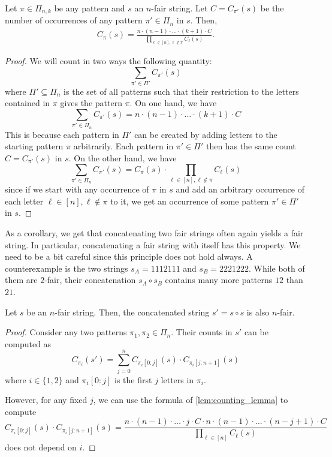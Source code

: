 \documentclass{article}
\begin{document}
\begin{lemma}
\label{lem:counting_lemma}
    Let $\pi \in \Pi_{n,k}$ be any pattern and $s$ an $n$-fair string. Let $C = C_{\pi'}(s)$ be the number of occurrences of any pattern $\pi' \in \Pi_n$ in $s$. Then, 
    \begin{align}
    \label{eq:counting_lemma}
    C_{\pi}(s) = \frac{n \cdot (n-1) \cdot \dots \cdot (k+1) \cdot C}{\prod_{\ell \in [n], \ell \not\in \pi} C_{\ell}(s) }. 
    \end{align}
\end{lemma}
\begin{proof}
We will count in two ways the following quantity: 
\[
\sum_{\pi' \in \Pi'}C_{\pi'}(s)
\]
where $\Pi' \subseteq \Pi_n$ is the set of all patterns such that their restriction to the letters contained in $\pi$ gives the pattern $\pi$. 
On one hand, we have  
\[
\sum_{\pi' \in \Pi_n}C_{\pi'}(s) 
=n \cdot (n-1) \cdot \dots \cdot (k+1) \cdot C
\]
This is because each pattern in $\Pi'$ can be created by adding letters to the starting pattern $\pi$ arbitrarily. Each pattern in $\pi' \in \Pi'$ then has the same count $C = C_{\pi'}(s)$ in $s$. 
On the other hand, we have  
\[
\sum_{\pi' \in \Pi_n}C_{\pi'}(s) 
= C_{\pi}(s) \cdot \prod_{\ell \in [n], \ell \not\in \pi} C_{\ell}(s)
\]
since if we start with any occurrence of $\pi$ in $s$ and add an arbitrary occurrence of each letter $\ell \in [n], \ell \not\in \pi$ to it, we get an occurrence of some pattern $\pi' \in \Pi'$ in $s$. 

\end{proof}

As a corollary, we get that concatenating two fair strings often again yields a fair string. In particular, concatenating a fair string with itself has this property. We need to be a bit careful since this principle does not hold always. A counterexample is the two strings $s_A = 1112111$ and $s_B = 2221222$. While both of them are $2$-fair, their concatenation $s_A \circ s_B$ contains many more patterns $12$ than $21$. 

\begin{corollary}
\label{cor:concat}
Let $s$ be an $n$-fair string. Then, the concatenated string $s' = s \circ s$ is also $n$-fair. 
\end{corollary}
\begin{proof}
    Consider any two patterns $\pi_1, \pi_2 \in \Pi_n$. Their counts in $s'$ can be computed as 
    \[
    C_{\pi_i}(s') = \sum_{j = 0}^{n} C_{\pi_i[0:j]}(s) \cdot C_{\pi_i[j:n+1]}(s)
    \]
    where $i \in \{1,2\}$ and $\pi_i[0:j]$ is the first $j$ letters in $\pi_i$. 

    However, for any fixed $j$, we can use the formula of \cref{lem:counting_lemma} to compute 
    \[
    C_{\pi_i[0:j]}(s) \cdot C_{\pi_i[j:n+1]}(s)
    =    \frac{n\cdot (n-1) \cdot \dots\cdot j \cdot C \cdot n \cdot (n-1) \cdot \dots \cdot (n-j+1) \cdot C }{\prod_{\ell \in [n]} C_\ell(s)}
    \]
    does not depend on $i$. 
\end{proof}
\end{document}
